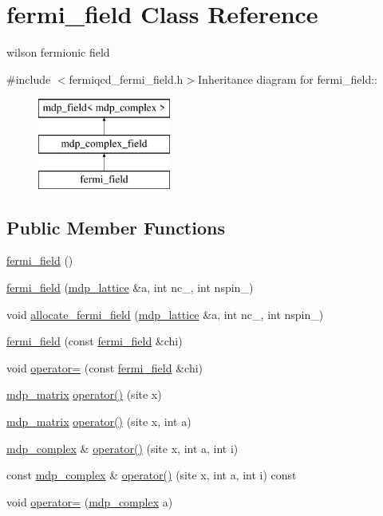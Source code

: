 \hypertarget{classfermi__field}{
\section{fermi\_\-field Class Reference}
\label{classfermi__field}
}


wilson fermionic field  


{\ttfamily \#include $<$fermiqcd\_\-fermi\_\-field.h$>$}Inheritance diagram for fermi\_\-field::\begin{figure}[H]
\begin{center}
\leavevmode
\includegraphics[height=3cm]{classfermi__field}
\end{center}
\end{figure}
\subsection*{Public Member Functions}
\begin{DoxyCompactItemize}
\item 
\hyperlink{classfermi__field_acaad044954df881d59d08b8b118b20e2}{fermi\_\-field} ()
\item 
\hyperlink{classfermi__field_a74efc2481ac9e64071680ebad9e93569}{fermi\_\-field} (\hyperlink{classmdp__lattice}{mdp\_\-lattice} \&a, int nc\_\-, int nspin\_)
\item 
void \hyperlink{classfermi__field_a4c185655183158f2f68edf3588d551d2}{allocate\_\-fermi\_\-field} (\hyperlink{classmdp__lattice}{mdp\_\-lattice} \&a, int nc\_\-, int nspin\_)
\item 
\hyperlink{classfermi__field_a91ca1df3aa4c49140191cee2816ab320}{fermi\_\-field} (const \hyperlink{classfermi__field}{fermi\_\-field} \&chi)
\item 
void \hyperlink{classfermi__field_abfaaf9b43f054fde18eaef3d80b1edf4}{operator=} (const \hyperlink{classfermi__field}{fermi\_\-field} \&chi)
\item 
\hyperlink{classmdp__matrix}{mdp\_\-matrix} \hyperlink{classfermi__field_a51ed4094b715fe01490b027513b49861}{operator()} (site x)
\item 
\hyperlink{classmdp__matrix}{mdp\_\-matrix} \hyperlink{classfermi__field_adbdc4231bf39f4d4d350471d587b0bd0}{operator()} (site x, int a)
\item 
\hyperlink{classmdp__complex}{mdp\_\-complex} \& \hyperlink{classfermi__field_a4f277f994dedde0d25448bb2f2a57b52}{operator()} (site x, int a, int i)
\item 
const \hyperlink{classmdp__complex}{mdp\_\-complex} \& \hyperlink{classfermi__field_a9850eef1de12386a50b0ce8c28507573}{operator()} (site x, int a, int i) const 
\item 
void \hyperlink{classfermi__field_a1fb7ce7e54f45a334ee55dc7250aba89}{operator=} (\hyperlink{classmdp__complex}{mdp\_\-complex} a)
\end{DoxyCompactItemize}
